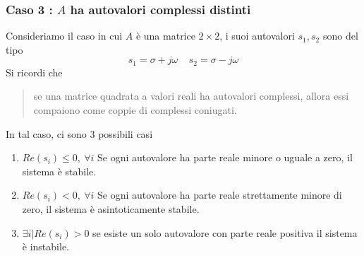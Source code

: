 \documentclass[10pt, letterpaper]{report}
\begin{document}
\subsubsection{Caso 3 : $A$ ha autovalori complessi distinti}
Consideriamo il caso in cui $A$ è una matrice 
$2\times 2$, i suoi autovalori $s_1,s_2$ sono del 
tipo 
$$ s_1=\sigma+j\omega  \ \ \ \ \ s_2=\sigma-j\omega$$ 
Si ricordi che \begin{quote}
    se una matrice quadrata a valori reali ha autovalori 
    complessi, allora essi compaiono come coppie di 
    complessi coniugati.
\end{quote}
In tal caso, ci sono 3 possibili casi\begin{enumerate}
    \item $Re(s_i)\le 0, \ \forall i$ Se ogni autovalore ha parte 
    reale minore o uguale a zero, il sistema è stabile.
    \item $Re(s_i)< 0, \ \forall i$ Se ogni autovalore ha parte 
    reale strettamente minore di zero, il sistema è asintoticamente stabile.
    \item $\exists i | Re(s_i)>0$ se esiste un solo autovalore con parte 
    reale positiva il sistema è instabile.
\end{enumerate}
\end{document}
